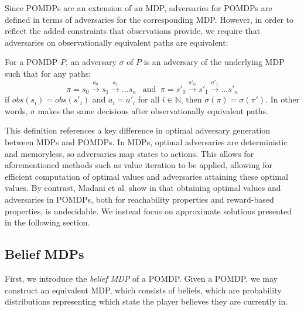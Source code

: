 Since POMDPs are an extension of an MDP, adversaries for POMDPs are defined in terms of adversaries for the corresponding MDP. However, in order to reflect the added constraints that observations provide, we require that adversaries on observationally equivalent paths are equivalent:

\begin{definition}
\label{cs1:pomdp_strats}

For a POMDP $P$, an adversary $\sigma$ of $P$ %
is an adversary of the underlying MDP such that for any paths:
\[
\pi = s_0 \xrightarrow{a_0} s_1 \xrightarrow{a_1} \dots s_n \;\;\ \mbox{and} \;\; \pi = s'_0 \xrightarrow{a'_0} s'_1 \xrightarrow{a'_1} \dots s'_n
\]
if $obs(s_i) = obs(s'_i)$ and $a_i = a'_i$ for all $i \in \mathbb{N}$, then $\sigma(\pi) = \sigma(\pi')$. In other words, $\sigma$ makes the same decisions after observationally equivalent paths.

\end{definition}

This definition references a key difference in optimal adversary generation between MDPs and POMDPs. In MDPs, optimal adversaries are deterministic and memoryless, so adversaries map states to actions. This allows for aforementioned methods such as value iteration to be applied, allowing for efficient computation of optimal values and adversaries attaining these optimal values. By contrast, Madani et al. show in \cite{madani_undecidability_2003} that obtaining optimal values and adversaries in POMDPs, both for reachability properties and reward-based properties, is undecidable. We instead focus on approximate solutions presented in the following section.

\subsection{Belief MDPs}
\label{cs2:intro_belief_mdps}

First, we introduce the \emph{belief MDP} of a POMDP. Given a POMDP, we may construct an equivalent MDP, which consists of beliefs, which are probability distributions representing which state the player believes they are currently in.

